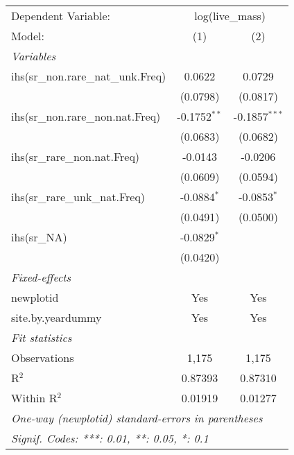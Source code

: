\begin{tabular}{lcc}
\tabularnewline\midrule\midrule
Dependent Variable:&\multicolumn{2}{c}{log(live\_mass)}\\
Model:&(1) & (2)\\
\midrule \emph{Variables}&   &  \\
ihs(sr\_non.rare\_nat\_unk.Freq)&0.0622 & 0.0729\\
  &(0.0798) & (0.0817)\\
ihs(sr\_non.rare\_non.nat.Freq)&-0.1752$^{**}$ & -0.1857$^{***}$\\
  &(0.0683) & (0.0682)\\
ihs(sr\_rare\_non.nat.Freq)&-0.0143 & -0.0206\\
  &(0.0609) & (0.0594)\\
ihs(sr\_rare\_unk\_nat.Freq)&-0.0884$^{*}$ & -0.0853$^{*}$\\
  &(0.0491) & (0.0500)\\
ihs(sr\_NA)&-0.0829$^{*}$ &   \\
  &(0.0420) &   \\
\midrule \emph{Fixed-effects}&   &  \\
newplotid & Yes & Yes\\
site.by.yeardummy & Yes & Yes\\
\midrule \emph{Fit statistics}&  & \\
Observations & 1,175&1,175\\
R$^2$ & 0.87393&0.87310\\
Within R$^2$ & 0.01919&0.01277\\
\midrule\midrule\multicolumn{3}{l}{\emph{One-way (newplotid) standard-errors in parentheses}}\\
\multicolumn{3}{l}{\emph{Signif. Codes: ***: 0.01, **: 0.05, *: 0.1}}\\
\end{tabular}


